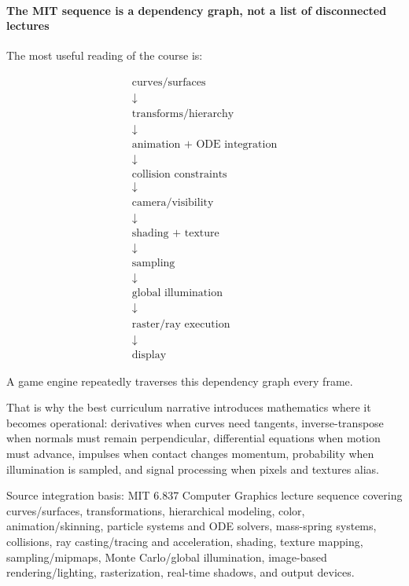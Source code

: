 \paragraph{The MIT sequence is a dependency graph, not a list of disconnected lectures}\label{03-visual-computing-i-ch001-the-mit-sequence-is-a-dependency-graph-not-a-list-of-disconnected-lectures}

\hypertarget{03-visual-computing-i-ch001-the-mit-sequence-is-a-dependency-graph-not-a-list-of-disconnected-lectures}{}

The most useful reading of the course is:

\[
\boxed{
\begin{array}{c}
\text{curves/surfaces}\\
\downarrow\\
\text{transforms/hierarchy}\\
\downarrow\\
\text{animation + ODE integration}\\
\downarrow\\
\text{collision constraints}\\
\downarrow\\
\text{camera/visibility}\\
\downarrow\\
\text{shading + texture}\\
\downarrow\\
\text{sampling}\\
\downarrow\\
\text{global illumination}\\
\downarrow\\
\text{raster/ray execution}\\
\downarrow\\
\text{display}
\end{array}
}
\]

A game engine repeatedly traverses this dependency graph every frame.

That is why the best curriculum narrative introduces mathematics where it becomes operational: derivatives when curves need tangents, inverse-transpose when normals must remain perpendicular, differential equations when motion must advance, impulses when contact changes momentum, probability when illumination is sampled, and signal processing when pixels and textures alias.

Source integration basis: MIT 6.837 Computer Graphics lecture sequence covering curves/surfaces, transformations, hierarchical modeling, color, animation/skinning, particle systems and ODE solvers, mass-spring systems, collisions, ray casting/tracing and acceleration, shading, texture mapping, sampling/mipmaps, Monte Carlo/global illumination, image-based rendering/lighting, rasterization, real-time shadows, and output devices.

